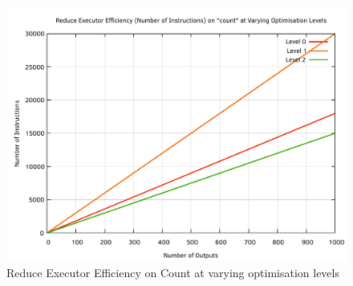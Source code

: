 \begin{figure}[htb]
    \centering
    \includegraphics[width=\textwidth - 60pt]{04_results/images/reduce_count_efficiency}
    \caption{Reduce Executor Efficiency on Count at varying optimisation levels}
    \label{fig:reduce_count_efficiency}
\end{figure}

